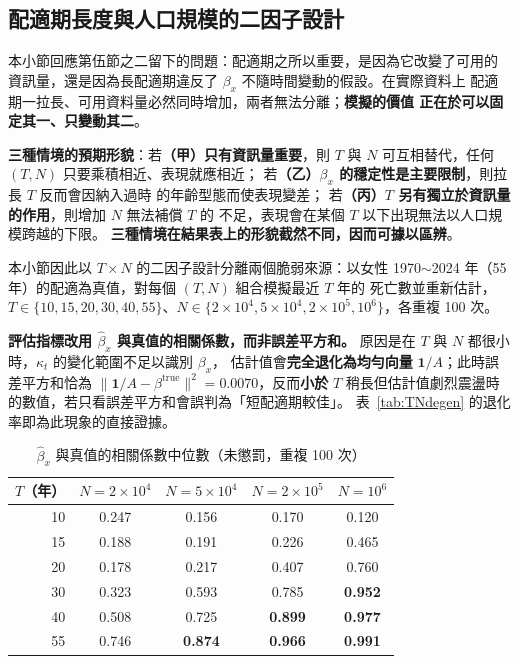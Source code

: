 \documentclass[UTF8, fontset=macnew, a4paper, 12pt]{ctexart}
\begin{document}
\subsection{配適期長度與人口規模的二因子設計}\label{sec:TN}

本小節回應第伍節之二留下的問題：配適期之所以重要，是因為它改變了可用的
資訊量，還是因為長配適期違反了 $\beta_x$ 不隨時間變動的假設。在實際資料上
配適期一拉長、可用資料量必然同時增加，兩者無法分離；\textbf{模擬的價值
正在於可以固定其一、只變動其二}。

\textbf{三種情境的預期形貌}：若\textbf{（甲）只有資訊量重要}，則 $T$ 與 $N$
可互相替代，任何 $(T,N)$ 只要乘積相近、表現就應相近；
若\textbf{（乙）$\beta_x$ 的穩定性是主要限制}，則拉長 $T$ 反而會因納入過時
的年齡型態而使表現變差；
若\textbf{（丙）$T$ 另有獨立於資訊量的作用}，則增加 $N$ 無法補償 $T$ 的
不足，表現會在某個 $T$ 以下出現無法以人口規模跨越的下限。
\textbf{三種情境在結果表上的形貌截然不同，因而可據以區辨}。

本小節因此以 $T\times N$ 的二因子設計分離兩個脆弱來源：以女性
1970$\sim$2024 年（55 年）的配適為真值，對每個 $(T,N)$ 組合模擬最近 $T$ 年的
死亡數並重新估計，$T\in\{10,15,20,30,40,55\}$、$N\in\{2\times10^4, 5\times10^4,
2\times10^5, 10^6\}$，各重複 100 次。

\textbf{評估指標改用 $\hat\beta_x$ 與真值的相關係數，而非誤差平方和。}
原因是在 $T$ 與 $N$ 都很小時，$\kappa_t$ 的變化範圍不足以識別 $\beta_x$，
估計值會\textbf{完全退化為均勻向量} $\mathbf{1}/A$；此時誤差平方和恰為
$\|\mathbf{1}/A-\beta^{\text{true}}\|^2=0.0070$，反而\textbf{小於}
$T$ 稍長但估計值劇烈震盪時的數值，若只看誤差平方和會誤判為「短配適期較佳」。
表~\ref{tab:TNdegen} 的退化率即為此現象的直接證據。

\begin{table}[H]
\centering
\caption{$\hat\beta_x$ 與真值的相關係數中位數（未懲罰，重複 100 次）}
\small
\begin{tabular}{rcccc}
\toprule
$T$（年） & $N=2\times10^4$ & $N=5\times10^4$ & $N=2\times10^5$ & $N=10^6$\\
\midrule
10 & 0.247 & 0.156 & 0.170 & 0.120\\
15 & 0.188 & 0.191 & 0.226 & 0.465\\
20 & 0.178 & 0.217 & 0.407 & 0.760\\
30 & 0.323 & 0.593 & 0.785 & \textbf{0.952}\\
40 & 0.508 & 0.725 & \textbf{0.899} & \textbf{0.977}\\
55 & 0.746 & \textbf{0.874} & \textbf{0.966} & \textbf{0.991}\\
\bottomrule
\end{tabular}
\label{tab:TNcor}
\end{table}
\end{document}
